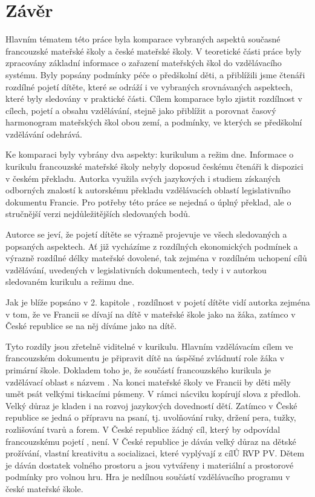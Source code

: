\chapter*{Závěr}
Hlavním tématem této práce byla komparace vybraných aspektů současné francouzské mateřské školy a české mateřské školy. V teoretické části práce byly zpracovány základní informace o zařazení mateřských škol do vzdělávacího systému. Byly popsány podmínky péče o předškolní děti, a přiblížili jsme čtenáři rozdílné pojetí dítěte, které se odráží i ve vybraných srovnávaných aspektech, které byly sledovány v praktické části. Cílem komparace bylo zjistit rozdílnost v cílech, pojetí a obsahu vzdělávání, stejně jako přiblížit a porovnat časový harmonogram mateřských škol obou zemí, a podmínky, ve kterých se předškolní vzdělávání odehrává.  

Ke komparaci byly vybrány dva aspekty: kurikulum a režim dne. Informace o kurikulu francouzské mateřské školy nebyly doposud českému čtenáři k dispozici v českém překladu. Autorka využila svých jazykových i studiem získaných odborných znalostí k autorskému překladu vzdělávacích oblastí legislativního dokumentu Francie. Pro potřeby této práce se nejedná o úplný překlad, ale o stručnější verzi nejdůležitějších sledovaných bodů. 

Autorce se jeví, že pojetí dítěte se výrazně projevuje ve všech sledovaných a popsaných aspektech. Ať již vycházíme z rozdílných ekonomických podmínek a výrazně rozdílné délky mateřské dovolené, tak zejména v rozdílném uchopení cílů vzdělávání, uvedených v legislativních dokumentech, tedy i v autorkou sledovaném kurikulu a režimu dne. 

Jak je blíže popsáno v 2. kapitole , rozdílnost v pojetí dítěte vidí autorka zejména v tom, že ve Francii se dívají na dítě v mateřské škole jako na žáka, zatímco v České republice se na něj díváme jako na dítě.   

Tyto rozdíly jsou zřetelně viditelné v kurikulu. Hlavním vzdělávacím cílem ve francouzském dokumentu je připravit dítě na úspěšné zvládnutí role žáka v primární škole. Dokladem toho je, že součástí francouzského kurikula je vzdělávací oblast s názvem . Na konci mateřské školy ve Francii by děti měly umět psát velkými tiskacími písmeny. V rámci nácviku kopírují slova z předloh. Velký důraz je kladen i na rozvoj jazykových dovedností dětí. Zatímco v České republice se jedná o přípravu na psaní, tj. uvolňování ruky, držení pera, tužky, rozlišování tvarů a forem. V České republice žádný cíl, který by odpovídal francouzskému pojetí , není. V České republice je dáván velký důraz na dětské prožívání, vlastní kreativitu a socializaci, které vyplývají z cílŮ RVP PV. Dětem je dáván dostatek volného prostoru a jsou vytvářeny i materiální a prostorové podmínky pro volnou hru. Hra je nedílnou součástí vzdělávacího programu v české mateřské škole. 


